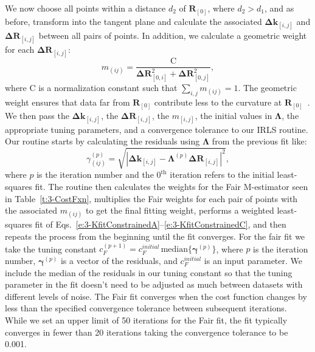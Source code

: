 We now choose all points within a distance $d_2$ of $\mathbf{R}_{[0]}$, where $d_2 > d_1$, and as before, transform into the tangent plane and calculate the associated $\mathbf{\Delta k}_{[i,j]}$ and $\mathbf{\Delta R}_{[i,j]}$ between all pairs of points.
In addition, we calculate a geometric weight for each $\mathbf{\Delta R}_{[i,j]}$:
\begin{equation}
  m_{(ij)} = \frac{\textrm{C}} {\mathbf{\Delta R}_{[0,i]}^2 + \mathbf{\Delta R}_{[0,j]}^2},
\end{equation}
where $\textrm{C}$ is a normalization constant such that $\sum\limits_{i,j} m_{(ij)} = 1$.
The geometric weight ensures that data far from $\mathbf{R}_{[0]}$ contribute less to the curvature at $\mathbf{R}_{[0]}$~\cite{RN32,RN31}.
We then pass the $\mathbf{\Delta k}_{[i,j]}$, the $\mathbf{\Delta R}_{[i,j]}$, the $m_{[i,j]}$, the initial values in $\bm{\Lambda}$, the appropriate tuning parameters, and a convergence tolerance to our IRLS routine.
Our routine starts by calculating the residuals using $\bm{\Lambda}$ from the previous fit like:
\begin{equation}
  \gamma_{(ij)}^{(p)} = \sqrt{|\mathbf{\Delta k}_{[i,j]}- \bm{\Lambda}^{(p)} \mathbf{\Delta R}_{[i,j]}|^2},
\end{equation}
where $p$ is the iteration number and the $0^{\textrm{th}}$ iteration refers to the initial least-squares fit.
The routine then calculates the weights for the Fair M-estimator seen in Table~\ref{t:3-CostFxn}, multiplies the Fair weights for each pair of points with the associated $m_{(ij)}$ to get the final fitting weight, performs a weighted least-squares fit of Eqs.~\ref{e:3-KfitConstrainedA}--\ref{e:3-KfitConstrainedC}, and then repeats the process from the beginning until the fit converges.
For the fair fit we take the tuning constant $c_F^{(p+1)} = c_F^{initial} \, \textrm{median}\{ \bm{\gamma}^{(p)} \}$, where $p$ is the iteration number, $\bm{\gamma}^{(p)}$ is a vector of the residuals, and $c_F^{initial}$ is an input parameter.
We include the median of the residuals in our tuning constant so that the tuning parameter in the fit doesn't need to be adjusted as much between datasets with different levels of noise.
The Fair fit converges when the cost function changes by less than the specified convergence tolerance between subsequent iterations.
While we set an upper limit of 50 iterations for the Fair fit, the fit typically converges in fewer than 20 iterations taking the convergence tolerance to be 0.001.

